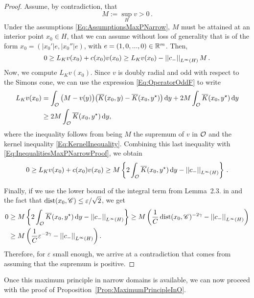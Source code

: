 \begin{proof}
	Assume, by contradiction, that
	$$
	M := \sup_H v > 0\,.
	$$
	Under the assumptions \eqref{Eq:AssumptionsMaxPNarrow}, $M$ must be attained at an interior point $x_0 \in H$, that we can assume without loss of generality that is of the form $x_0 = (|x_0'|e,|x_0''|e)$, with $e=(1,0,...,0)\in\mathbb{R}^m$. Then,
	\begin{equation}
	\label{Eq:InequalitiesMaxPNarrowProof}
	0 \geq L_K  v(x_0) + c(x_0)v(x_0) \geq L_K  v(x_0) - \left | \left |{c_-} \right | \right |_{L^\infty(H)}M\,.
	\end{equation} 
	Now, we compute $L_K  v(x_0)$. Since $v$ is doubly radial and odd with respect to the Simons cone, we can use the expression \eqref{Eq:OperatorOddF} to write
	\begin{align*}
	L_K v(x_0) &= \int_{\mathcal{O}} \big (M - v(y) \big) \big (\overline{K}(x_0,y) -\overline{K}(x_0,y^\star)\big) \,\mathrm{d} y + 2M\int_{\mathcal{O}} \overline{K}(x_0,y^\star)\,\mathrm{d} y\\
    &\geq2M \int_{\mathcal{O}} \overline{K}(x_0,y^\star)\,\mathrm{d} y,
	\end{align*}
    where the inequality follows from being $M$ the supremum of $v$ in $\mathcal{O}$ and the kernel inequality \eqref{Eq:KernelInequality}. Combining this last inequality with \eqref{Eq:InequalitiesMaxPNarrowProof}, we obtain
	$$
	0 \geq L_K  v(x_0) + c(x_0)v(x_0)  \geq M \left\{ 2 \int_{\mathcal{O}} \overline{K}(x_0,y^\star)\,\mathrm{d} y - \left | \left |{c_-} \right | \right |_{L^\infty(H)}
	\right\}\,.
	$$
	
	Finally, if we use the lower bound of the integral term from Lemma~2.3. in \cite{FelipeSanz-Perela:IntegroDifferentialI} and the fact that $\operatorname{dist}(x_0,\mathscr{C}) \leq \varepsilon/\sqrt{2}$, we get
	\begin{align*}
	0 &\geq M \left\{ 2 \int_{\mathcal{O}} \overline{K}(x_0,y^\star)\,\mathrm{d} y - \left | \left |{c_-} \right | \right |_{L^\infty(H)}
	\right\} \geq M \left(\frac{1}{C}\operatorname{dist}(x_0,\mathscr{C})^{-2\gamma}-\left | \left |{c_-} \right | \right |_{L^\infty(H)}\right) \\ &\geq M \left(\frac{1}{C}\varepsilon^{-2\gamma}-\left | \left |{c_-} \right | \right |_{L^\infty(H)}\right).
	\end{align*}
	Therefore, for $\varepsilon$ small enough, we arrive at a contradiction that comes from assuming that the supremum is positive.
\end{proof}

Once this maximum principle in narrow domains is available, we can now proceed with the proof of Proposition~\ref{Prop:MaximumPrincipleInO}.

